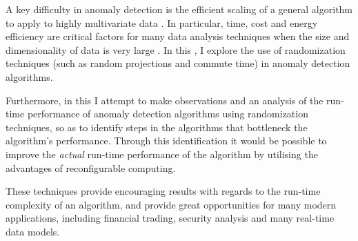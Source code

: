 A key difficulty in anomaly detection is the efficient scaling of a general
algorithm to apply to highly multivariate data \citeNeeded{}. In particular,
time, cost and energy efficiency are critical factors for many data analysis
techniques when the size and dimensionality of data is very large
\cite{Vries:2011}. In this \thesis{}, I explore the use of randomization
techniques (such as random projections and commute time) in anomaly detection
algorithms.

Furthermore, in this \thesis{} I attempt to make observations and an analysis of
the run-time performance of anomaly detection algorithms using randomization
techniques, so as to identify steps in the algorithms that bottleneck the
algorithm's performance. Through this identification it would be possible to
improve the \emph{actual} run-time performance of the algorithm by utilising the
advantages of reconfigurable computing.

These techniques provide encouraging results with regards to the run-time
complexity of an algorithm, and provide great opportunities for many modern
applications, including financial trading, security analysis and many real-time
data models.